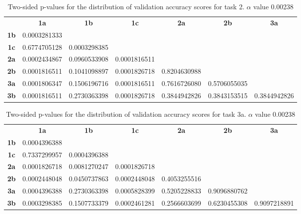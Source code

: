 \begin{table}[h!]
    \centering
    \begin{tabular}{ccccccc}
                & \textbf{1a}        & \textbf{1b}        & \textbf{1c}        & \textbf{2a}  & \textbf{2b}  & \textbf{3a}  \\
    \textbf{1b} & 0.0003281333 &                    &                    &              &              &              \\
    \textbf{1c} & 0.6774705128 & 0.0003298385       &                    &              &              &              \\
    \textbf{2a} & 0.0002434867 & 0.0960533908       & 0.0001816511       &              &              &              \\
    \textbf{2b} & 0.0001816511 & 0.1041098897       & 0.0001826718       & 0.8204630988 &              &              \\
    \textbf{3a} & 0.0001806347 & 0.1506196716       & 0.0001816511       & 0.7616726080 & 0.5706055035 &              \\
    \textbf{3b} & 0.0001816511 & 0.2730363398       & 0.0001826718       & 0.3844942826 & 0.3843153515 & 0.3844942826
    \end{tabular}
    \caption[p-table for validation accuracy (task 2)]{Two-sided p-values for the distribution of validation accuracy scores for task 2. \(\alpha\) value 0.00238}
    \label{tab:exp2.validation2}
\end{table}

\newpage

\begin{table}[h!]
    \centering
    \begin{tabular}{ccccccc}
                & \textbf{1a}        & \textbf{1b}        & \textbf{1c}        & \textbf{2a}  & \textbf{2b}  & \textbf{3a}  \\
    \textbf{1b} & 0.0004396388 &                    &                    &              &              &              \\
    \textbf{1c} & 0.7337299957 & 0.0004396388       &                    &              &              &              \\
    \textbf{2a} & 0.0001826718 & 0.0081270247       & 0.0001826718       &              &              &              \\
    \textbf{2b} & 0.0002448048 & 0.0450737863       & 0.0002448048       & 0.4053255516 &              &              \\
    \textbf{3a} & 0.0004396388 & 0.2730363398       & 0.0005828399       & 0.5205228833 & 0.9096880762 &              \\
    \textbf{3b} & 0.0003298385 & 0.1507733379       & 0.0002461281       & 0.2566603699 & 0.6230455308 & 0.9097218891
    \end{tabular}
    \caption[p-table for validation accuracy (task 3a)]{Two-sided p-values for the distribution of validation accuracy scores for task 3a. \(\alpha\) value 0.00238}
    \label{tab:exp2.validation3a}
\end{table}

